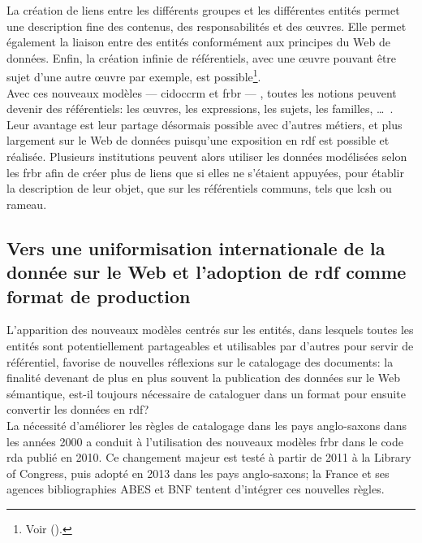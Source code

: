 La création de liens entre les différents groupes et les différentes entités permet une description fine des contenus, des responsabilités et des œuvres. Elle permet également la liaison entre des entités conformément aux principes du Web de données. Enfin, la création infinie de référentiels, avec une œuvre pouvant être sujet d'une autre œuvre par exemple, est possible\footnote{Voir  ().}.\\

Avec ces nouveaux modèles --- \ac{cidoccrm} et \ac{frbr} --- , toutes les notions peuvent devenir des référentiels: les œuvres, les expressions, les sujets, les familles, \dots~. Leur avantage est leur partage désormais possible avec d'autres métiers, et plus largement sur le Web de données puisqu'une exposition en \ac{rdf} est possible et réalisée. Plusieurs institutions peuvent alors utiliser les données modélisées selon les \ac{frbr} afin de créer plus de liens que si elles ne s'étaient appuyées, pour établir la description de leur objet, que sur les référentiels communs, tels que \ac{lcsh} ou \ac{rameau}.

\subsection{\label{II-A-3-b}Vers une uniformisation internationale de la donnée sur le Web et l'adoption de \ac{rdf} comme format de production}

L'apparition des nouveaux modèles centrés sur les entités, dans lesquels toutes les entités sont potentiellement partageables et utilisables par d'autres pour servir de référentiel, favorise de nouvelles réflexions sur le catalogage des documents: la finalité devenant de plus en plus souvent la publication des données sur le Web sémantique, est-il toujours nécessaire de cataloguer dans un format pour ensuite convertir les données en \ac{rdf}?\\

La nécessité d'améliorer les règles de catalogage dans les pays anglo-saxons dans les années 2000 a conduit à l'utilisation des nouveaux modèles \ac{frbr} dans le code \ac{rda} publié en 2010. Ce changement majeur est testé à partir de 2011 à la Library of Congress, puis adopté en 2013 dans les pays anglo-saxons; la France et ses agences bibliographies ABES et BNF tentent d'intégrer ces nouvelles règles.\\

